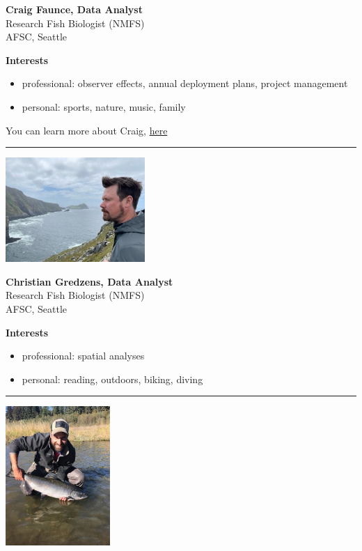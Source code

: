 \documentclass[
  letterpaper,
  DIV=11,
  numbers=noendperiod]{scrreprt}
\providecommand{\tightlist}{%
  \setlength{\itemsep}{0pt}\setlength{\parskip}{0pt}}\usepackage{longtable,booktabs,array}
\begin{document}
\textbf{Craig Faunce, Data Analyst}\\
Research Fish Biologist (NMFS)\\
AFSC, Seattle

\textbf{Interests}

\begin{itemize}
\tightlist
\item
  professional: observer effects, annual deployment plans, project
  management\\
\item
  personal: sports, nature, music, family
\end{itemize}

You can learn more about Craig,
\href{https://www.fisheries.noaa.gov/contact/craig-h-faunce}{here}

\begin{center}\rule{0.5\linewidth}{0.5pt}\end{center}

\includegraphics[width=\textwidth,height=1.5625in]{_img/ChristianGredzens.jpg}

\textbf{Christian Gredzens, Data Analyst}\\
Research Fish Biologist (NMFS)\\
AFSC, Seattle

\textbf{Interests}

\begin{itemize}
\tightlist
\item
  professional: spatial analyses\\
\item
  personal: reading, outdoors, biking, diving
\end{itemize}

\begin{center}\rule{0.5\linewidth}{0.5pt}\end{center}

\includegraphics[width=\textwidth,height=2.08333in]{_img/AndyKingham.jpg}
\end{document}
